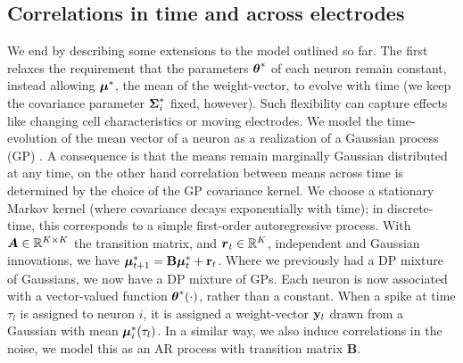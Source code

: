 \subsection{Correlations in time and across electrodes}
We end by describing some extensions to the model outlined so far. 
The first relaxes the requirement that the parameters $\boldsymbol{\theta}^*$ of each neuron remain constant, instead allowing $\boldsymbol{\mu}^*$, the mean of the weight-vector,
to evolve with time (we keep the covariance parameter $\boldsymbol{\Sigma}^*_i$ fixed, however). Such flexibility can capture effects like changing cell 
characteristics or moving electrodes.
We model the time-evolution of the mean vector of a neuron as a realization of a Gaussian process (GP) \citep{RasWil2006}. A consequence is that the 
means remain marginally Gaussian distributed at any time, on the other hand correlation between means across time is determined by the choice 
of the GP covariance kernel.
We choose a stationary Markov kernel (where covariance decays exponentially with time); in discrete-time, this corresponds to a simple first-order 
autoregressive process. With $\boldsymbol{A} \in \mathbb{R}^{K \times K}$ the transition matrix, and $\boldsymbol{r}_t \in \mathbb{R}^K$, 
independent and Gaussian {innovations}, we have
% 
  $\boldsymbol{\mu}^*_{t+1} = \mathbf{B} \boldsymbol{\mu}^*_t + \mathbf{r}_t$.
Where we previously had a DP mixture of Gaussians, we now have a DP mixture of GPs. Each neuron is now associated with a vector-valued function 
$\boldsymbol{\theta}^*(\cdot)$, rather than a constant. When a spike at time $\tau_l$ is assigned to neuron $i$, it is assigned a weight-vector $\mathbf{y}_l$ drawn from a 
Gaussian with mean $\boldsymbol{\mu}^*_i(\tau_l)$. %
In a similar way, we also induce correlations in the noise, we model this as an AR process with transition matrix $\mathbf{B}$.

